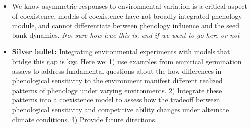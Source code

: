 \documentclass{article}[12pt]
\begin{document}
\begin{itemize}
\item We know asymmetric responses to environmental variation is a critical aspect of coexistence, models of coexistence have not broadly integrated phenology module, and cannot differentiate between phenology influence and the seed bank dynamics. \textit{Not sure how true this is, and if we want to go here or not}

\item \textbf{Silver bullet:} Integrating environmental experiments with models that bridge this gap is key.  Here we: %
1) use examples from empirical germination assays to address fundamental questions about the how differences in phenological sensitivity to the environment manifest different realized patterns of phenology under varying environments.
2) Integrate these patterns into a coexistence model to assess how the tradeoff between phenological sensitivity and competitive ability changes under alternate climate conditions.
3) Provide future directions.
\end{itemize}


\end{document}
